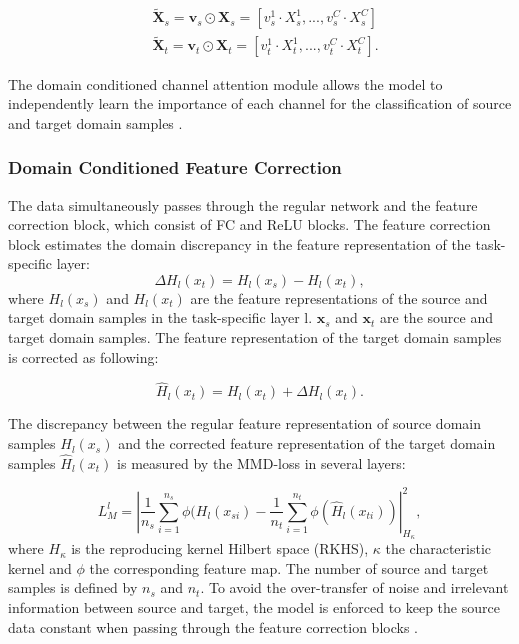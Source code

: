 \begin{equation}
    \begin{aligned}
        &\pmb{\tilde{X}}_{s} = \pmb{v}_{s} \odot \pmb{X}_{s} = [v_{s}^{1} \cdot X_{s}^{1}, ..., v_{s}^{C} \cdot X_{s}^{C}]\\
        &\pmb{\tilde{X}}_{t} = \pmb{v}_{t} \odot \pmb{X}_{t} = [v_{t}^{1} \cdot X_{t}^{1}, ..., v_{t}^{C} \cdot X_{t}^{C}].
    \end{aligned}
\end{equation}

The domain conditioned channel attention module allows the model to independently learn the importance of each channel for the classification of source and target domain samples \cite{li2020}.


\subsubsection{Domain Conditioned Feature Correction}
The data simultaneously passes through the regular network and the feature correction block, which consist of FC and ReLU blocks. The feature correction block estimates the domain discrepancy in the feature representation of the task-specific layer:
\begin{equation}
    \Delta H_{l}(x_{t}) = H_{l}(x_{s}) - H_{l}(x_{t}),
\end{equation}
where $H_{l}(x_{s})$ and $H_{l}(x_{t})$ are the feature representations of the source and target domain samples in the task-specific layer l. $\pmb{x}_{s}$ and $\pmb{x}_{t}$ are the source and target domain samples. The feature representation of the target domain samples is corrected as following:

\begin{equation}
    \hat{H}_{l}(x_{t}) = H_{l}(x_{t}) + \Delta H_{l}(x_{t}).
\end{equation}

The discrepancy between the regular feature representation of source domain samples $H_{l}(x_{s})$ and the corrected feature representation of the target domain samples $\hat{H}_{l}(x_{t})$ is measured by the MMD-loss in several layers:

\begin{equation}
    L_{M}^{l} = |\frac{1}{n_s} \sum_{i=1}^{n_{s}} \phi(H_{l}(x_{si}) - \frac{1}{n_t} \sum_{i=1}^{n_{t}} \phi(\hat{H}_{l}(x_{ti}))|_{H_{\kappa}}^{2}, 
\end{equation}
where $H_{\kappa}$ is the reproducing kernel Hilbert space (RKHS), $\kappa$ the characteristic kernel and $\phi$ the corresponding feature map. The number of source and target samples is defined by $n_{s}$ and $n_{t}$. To avoid the over-transfer of noise and irrelevant information between source and target, the model is enforced to keep the source data constant when passing through the feature correction blocks \cite{li2020}.

